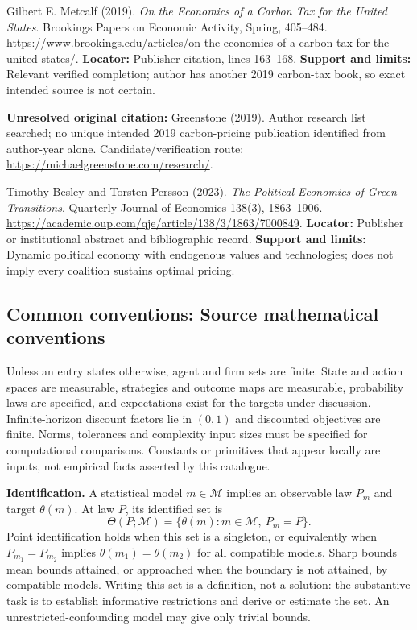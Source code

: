 \documentclass[11pt,a4paper]{article}
\begin{document}
\begin{enumerate}[label={[\textnormal{S}\arabic*]},leftmargin=*]

\item Gilbert E. Metcalf (2019). \emph{On the Economics of a Carbon Tax for the United States}. Brookings Papers on Economic Activity, Spring, 405–484. \url{https://www.brookings.edu/articles/on-the-economics-of-a-carbon-tax-for-the-united-states/}. \textbf{Locator:} Publisher citation, lines 163–168. \textbf{Support and limits:} Relevant verified completion; author has another 2019 carbon-tax book, so exact intended source is not certain.

\item \textbf{Unresolved original citation:} Greenstone (2019). Author research list searched; no unique intended 2019 carbon-pricing publication identified from author-year alone. Candidate/verification route: \url{https://michaelgreenstone.com/research/}.

\item Timothy Besley and Torsten Persson (2023). \emph{The Political Economics of Green Transitions}. Quarterly Journal of Economics 138(3), 1863–1906. \url{https://academic.oup.com/qje/article/138/3/1863/7000849}. \textbf{Locator:} Publisher or institutional abstract and bibliographic record. \textbf{Support and limits:} Dynamic political economy with endogenous values and technologies; does not imply every coalition sustains optimal pricing.

\end{enumerate}

\subsection*{Common conventions: Source mathematical conventions}

Unless an entry states otherwise, agent and firm sets are finite. State and action spaces are measurable, strategies and outcome maps are measurable, probability laws are specified, and expectations exist for the targets under discussion. Infinite-horizon discount factors lie in $(0,1)$ and discounted objectives are finite. Norms, tolerances and complexity input sizes must be specified for computational comparisons. Constants or primitives that appear locally are inputs, not empirical facts asserted by this catalogue.

\textbf{Identification.} A statistical model $m\in\mathcal M$ implies an observable law $P_m$ and target $\theta(m)$. At law $P$, its identified set is
\[
\Theta(P;\mathcal M)=\{\theta(m):m\in\mathcal M,\ P_m=P\}.
\]
Point identification holds when this set is a singleton, or equivalently when $P_{m_1}=P_{m_2}$ implies $\theta(m_1)=\theta(m_2)$ for all compatible models. Sharp bounds mean bounds attained, or approached when the boundary is not attained, by compatible models. Writing this set is a definition, not a solution: the substantive task is to establish informative restrictions and derive or estimate the set. An unrestricted-confounding model may give only trivial bounds.
\end{document}
